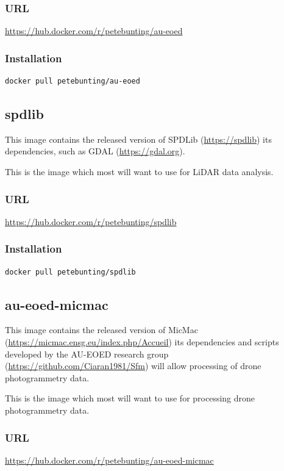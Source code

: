 \documentclass[authoryear, 11pt, oneside]{report}
\begin{document}
\subsubsection{URL}
\url{https://hub.docker.com/r/petebunting/au-eoed}

\subsubsection{Installation}

\begin{verbatim}
docker pull petebunting/au-eoed
\end{verbatim}

\subsection{spdlib}

This image contains the released version of SPDLib (\url{https://spdlib}) its dependencies, such as GDAL (\url{https://gdal.org}). 

This is the image which most will want to use for LiDAR data analysis.

\subsubsection{URL}
\url{https://hub.docker.com/r/petebunting/spdlib}

\subsubsection{Installation}

\begin{verbatim}
docker pull petebunting/spdlib
\end{verbatim}


\subsection{au-eoed-micmac}

This image contains the released version of MicMac (\url{https://micmac.ensg.eu/index.php/Accueil}) its dependencies and scripts developed by the AU-EOED research group (\url{https://github.com/Ciaran1981/Sfm}) will allow processing of drone photogrammetry data. 

This is the image which most will want to use for processing drone photogrammetry data.

\subsubsection{URL}
\url{https://hub.docker.com/r/petebunting/au-eoed-micmac}
\end{document}
